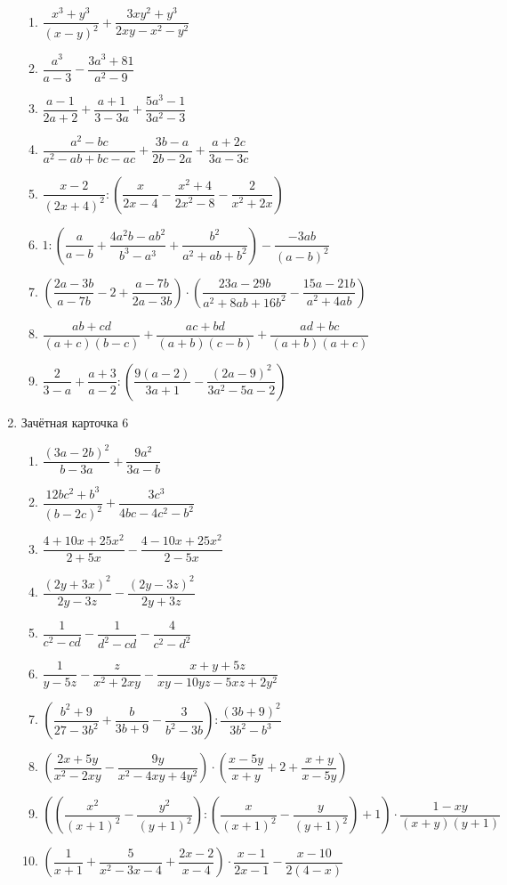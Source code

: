 \documentclass[12pt, a4paper]{article}
\begin{document}
\begin{enumerate}
\begin{enumerate}[label=\asbuk*)]
	\item \( \dfrac{x^3+y^3}{(x-y)^2}+\dfrac{3xy^2+y^3}{2xy-x^2-y^2} \)
	\item \( \dfrac{a^3}{a-3}-\dfrac{3a^3+81}{a^2-9} \)
	\item \( \dfrac{a-1}{2a+2}+\dfrac{a+1}{3-3a}+\dfrac{5a^3-1}{3a^2-3} \)
	\item \( \dfrac{a^2-bc}{a^2-ab+bc-ac}+\dfrac{3b-a}{2b-2a}+\dfrac{a+2c}{3a-3c} \)
	\item \( \dfrac{x-2}{(2x+4)^2}:\left( \dfrac{x}{2x-4}-\dfrac{x^2+4}{2x^2-8}-\dfrac{2}{x^2+2x} \right) \)
	\item \( 1:\left( \dfrac{a}{a-b}+\dfrac{4a^2b-ab^2}{b^3-a^3}+\dfrac{b^2}{a^2+ab+b^2} \right) -\dfrac{-3ab}{(a-b)^2}\)
	\item \( \left( \dfrac{2a-3b}{a-7b}-2+\dfrac{a-7b}{2a-3b} \right)\cdot\left( \dfrac{23a-29b}{a^2+8ab+16b^2}-\dfrac{15a-21b}{a^2+4ab} \right) \)
	\item \( \dfrac{ab+cd}{(a+c)(b-c)}+\dfrac{ac+bd}{(a+b)(c-b)}+\dfrac{ad+bc}{(a+b)(a+c)} \)
	\item \( \dfrac{2}{3-a}+\dfrac{a+3}{a-2}:\left( \dfrac{9(a-2)}{3a+1}-\dfrac{(2a-9)^2}{3a^2-5a-2} \right) \)
\end{enumerate}
\item Зачётная карточка 6
\begin{enumerate}[label=\asbuk*)]
	\item \( \dfrac{(3a-2b)^2}{b-3a}+\dfrac{9a^2}{3a-b} \)
	\item \( \dfrac{12bc^2+b^3}{(b-2c)^2}+\dfrac{3c^3}{4bc-4c^2-b^2} \)
	\item \( \dfrac{4+10x+25x^2}{2+5x}-\dfrac{4-10x+25x^2}{2-5x} \)
	\item \( \dfrac{(2y+3x)^2}{2y-3z}-\dfrac{(2y-3z)^2}{2y+3z} \)
	\item \( \dfrac{1}{c^2-cd}-\dfrac{1}{d^2-cd}-\dfrac{4}{c^2-d^2} \)
	\item \( \dfrac{1}{y-5z}-\dfrac{z}{x^2+2xy}-\dfrac{x+y+5z}{xy-10yz-5xz+2y^2} \)
	\item \( \left( \dfrac{b^2+9}{27-3b^2}+\dfrac{b}{3b+9}-\dfrac{3}{b^2-3b} \right):\dfrac{(3b+9)^2}{3b^2-b^3} \)
	\item \( \left( \dfrac{2x+5y}{x^2-2xy}-\dfrac{9y}{x^2-4xy+4y^2} \right)\cdot\left( \dfrac{x-5y}{x+y}+2+\dfrac{x+y}{x-5y} \right) \)
	\item \( \left( \left( \dfrac{x^2}{(x+1)^2}-\dfrac{y^2}{(y+1)^2} \right) :\left(\dfrac{x}{(x+1)^2}-\dfrac{y}{(y+1)^2}  \right)+1\right)\cdot\dfrac{1-xy}{(x+y)(y+1)} \)
	\item \( \left( \dfrac{1}{x+1}+\dfrac{5}{x^2-3x-4}+\dfrac{2x-2}{x-4} \right) \cdot\dfrac{x-1}{2x-1}-\dfrac{x-10}{2(4-x)}\)

\end{enumerate}
\end{enumerate}
\end{document}
